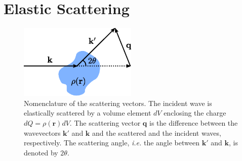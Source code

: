 \section{Elastic Scattering}
\begin{figure}
\centering
\includegraphics[width=0.5\textwidth]{diffraction/figures/scattering_vectors.eps}
\caption{Nomenclature of the scattering vectors. The incident wave is elastically scattered by a volume element $dV$ enclosing the charge $dQ = \rho(\mathbf{r}) dV$. The scattering vector $\mathbf{q}$ is the difference between the wavevectors $\mathbf{k}'$ and $\mathbf{k}$ and the scattered and the incident waves, respectively. The scattering angle, \emph{i.e.} the angle between $\mathbf{k}'$ and $\mathbf{k}$, is denoted by $2\theta$. \label{fig:elastic_scattering_vectors}}
\end{figure}

